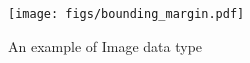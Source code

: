 \begin{figure}[h!]
    \centering
    \texttt{[image: figs/bounding\_margin.pdf]}
    \caption{An example of Image data type}
    \label{fig:image_example}
    \vspace{-10pt}
\end{figure}